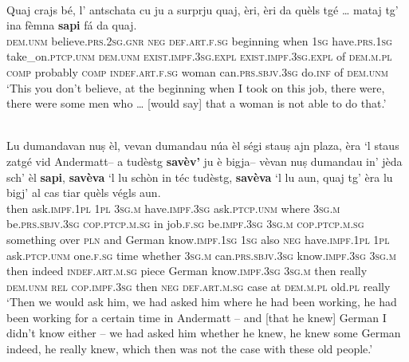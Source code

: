 \ea
\label{ex:savaj5}
\\
\gll  Quaj crajs bé, l’ antschata cu ju a surprju quaj, èri, èri da quèls tgé … mataj\footnotemark{} tg’ ina fèmna \textbf{sapi} fá da quaj.\\
\textsc{dem.unm} believe.\textsc{prs.2sg.gnr} \textsc{neg} \textsc{def.art.f.sg} beginning when \textsc{1sg} have.\textsc{prs.1sg} take\_on.\textsc{ptcp.unm} \textsc{dem.unm} \textsc{exist.impf.3sg.expl} \textsc{exist.impf.3sg.expl} of \textsc{dem.m.pl} \textsc{comp} {} probably \textsc{comp} \textsc{indef.art.f.sg} woman can.\textsc{prs.sbjv.3sg} do.\textsc{inf} of \textsc{dem.unm}\\
\glt `This you don’t believe, at the beginning when I took on this job, there were, there were some men who … [would say] that a woman is not able to do that.'
\z

\ea
\label{ex:savaj6}
\\
\gll Lu dumandavan nuṣ èl, vevan dumandau núa èl ségi stauṣ ajn plaza, èra `l staus zatgé vid Andermatt– a tudèstg \textbf{savèv’} ju è bigja– vèvan nuṣ dumandau in' jèda sch’ èl \textbf{sapi}, \textbf{savèva} `l lu schòn in téc tudèstg, \textbf{savèva} `l lu aun, quaj tg’ èra lu bigj' al cas tiar quèls végls aun.   \\
then ask.\textsc{impf.1pl} \textsc{1pl} \textsc{3sg.m} have.\textsc{impf.3sg}  ask.\textsc{ptcp.unm} where \textsc{3sg.m} be.\textsc{prs.sbjv.3sg} \textsc{cop.ptcp.m.sg} in job.\textsc{f.sg} be.\textsc{impf.3sg} \textsc{3sg.m}  \textsc{cop.ptcp.m.sg} something over \textsc{pln} and German know.\textsc{impf.1sg} \textsc{1sg} also \textsc{neg} have.\textsc{impf.1pl} \textsc{1pl} ask.\textsc{ptcp.unm} one.\textsc{f.sg} time whether \textsc{3sg.m} can.\textsc{prs.sbjv.3sg} know.\textsc{impf.3sg} \textsc{3sg.m} then indeed \textsc{indef.art.m.sg} piece German know.\textsc{impf.3sg} \textsc{3sg.m} then really \textsc{dem.unm} \textsc{rel} \textsc{cop.impf.3sg} then \textsc{neg} \textsc{def.art.m.sg} case at \textsc{dem.m.pl} old.\textsc{pl} really \\
\glt `Then we would ask him, we had asked him where he had been working, he had been working for a certain time in Andermatt – and [that he knew] German I didn't know either – we had asked him whether he knew, he knew some German indeed, he really knew, which then was not the case with these old people.'
\z

